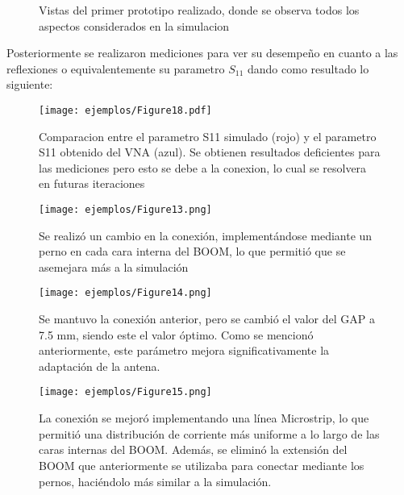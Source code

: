   \begin{figure}[H]
    \centering
    \quad
    \caption{Vistas del primer prototipo realizado, donde se observa todos los aspectos considerados en la simulacion}
    \label{fig:example}
\end{figure}
Posteriormente se realizaron mediciones para ver su desempeño en cuanto a las reflexiones o equivalentemente su parametro $S_{11}$ dando como resultado lo siguiente:
\begin{figure}
	\centering
	\texttt{[image: ejemplos/Figure18.pdf]}
	\caption{Comparacion entre el parametro S11 simulado (rojo) y el parametro S11 obtenido del VNA (azul). Se obtienen resultados deficientes para las mediciones pero esto se debe a la conexion, lo cual se resolvera en futuras iteraciones}
	\label{fig:esqumea_antena}
\end{figure}
\begin{figure}
	\centering
	\texttt{[image: ejemplos/Figure13.png]}
	\caption{Se realizó un cambio en la conexión, implementándose mediante un perno en cada cara interna del BOOM, lo que permitió que se asemejara más a la simulación}
	\label{fig:esqumea_antena}
\end{figure}
\begin{figure}
	\centering
	\texttt{[image: ejemplos/Figure14.png]}
	\caption{Se mantuvo la conexión anterior, pero se cambió el valor del GAP a 7.5 mm, siendo este el valor óptimo. Como se mencionó anteriormente, este parámetro mejora significativamente la adaptación de la antena.}
	\label{fig:esqumea_antena}
\end{figure}
\begin{figure}
	\centering
	\texttt{[image: ejemplos/Figure15.png]}
	\caption{La conexión se mejoró implementando una línea Microstrip, lo que permitió una distribución de corriente más uniforme a lo largo de las caras internas del BOOM. Además, se eliminó la extensión del BOOM que anteriormente se utilizaba para conectar mediante los pernos, haciéndolo más similar a la simulación.}
	\label{fig:esqumea_antena}
\end{figure}
